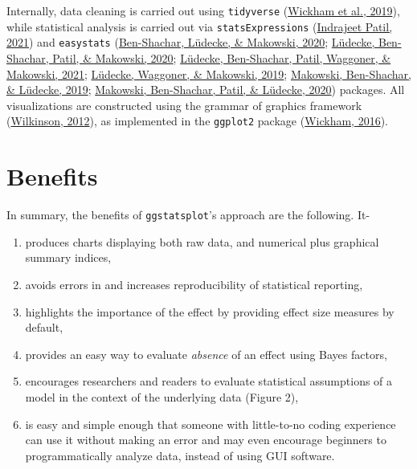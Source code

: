 \documentclass[
]{article}
\begin{document}
Internally, data cleaning is carried out using \texttt{tidyverse}
(\protect\hyperlink{ref-Wickham2019}{Wickham et al., 2019}), while
statistical analysis is carried out via \texttt{statsExpressions}
(\protect\hyperlink{ref-Patil2021}{Indrajeet Patil, 2021}) and
\texttt{easystats} (\protect\hyperlink{ref-Ben-Shachar2020}{Ben-Shachar,
Lüdecke, \& Makowski, 2020};
\protect\hyperlink{ref-Luxfcdecke2020parameters}{Lüdecke, Ben-Shachar,
Patil, \& Makowski, 2020};
\protect\hyperlink{ref-Luxfcdecke2020performance}{Lüdecke, Ben-Shachar,
Patil, Waggoner, \& Makowski, 2021};
\protect\hyperlink{ref-Luxfcdecke2019}{Lüdecke, Waggoner, \& Makowski,
2019}; \protect\hyperlink{ref-Makowski2019}{Makowski, Ben-Shachar, \&
Lüdecke, 2019}; \protect\hyperlink{ref-Makowski2020}{Makowski,
Ben-Shachar, Patil, \& Lüdecke, 2020}) packages. All visualizations are
constructed using the grammar of graphics framework
(\protect\hyperlink{ref-Wilkinson2012}{Wilkinson, 2012}), as implemented
in the \texttt{ggplot2} package
(\protect\hyperlink{ref-Wickham2016}{Wickham, 2016}).

\hypertarget{benefits}{%
\section{Benefits}\label{benefits}}

In summary, the benefits of \texttt{ggstatsplot}'s approach are the
following. It-

\begin{enumerate}
\def\labelenumi{\alph{enumi}.}
\item
  produces charts displaying both raw data, and numerical plus graphical
  summary indices,
\item
  avoids errors in and increases reproducibility of statistical
  reporting,
\item
  highlights the importance of the effect by providing effect size
  measures by default,
\item
  provides an easy way to evaluate \emph{absence} of an effect using
  Bayes factors,
\item
  encourages researchers and readers to evaluate statistical assumptions
  of a model in the context of the underlying data (Figure 2),
\item
  is easy and simple enough that someone with little-to-no coding
  experience can use it without making an error and may even encourage
  beginners to programmatically analyze data, instead of using GUI
  software.
\end{enumerate}
\end{document}
